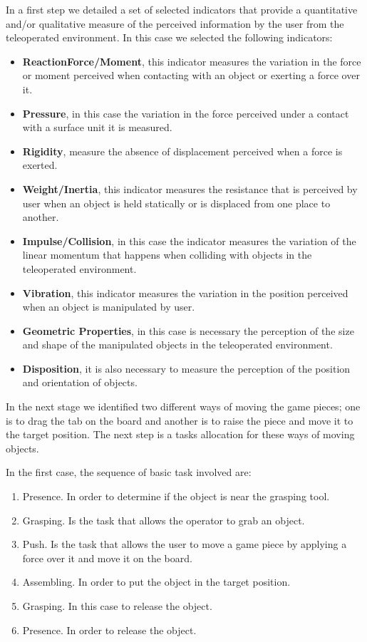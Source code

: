 \documentclass[journal,twoside]{JoPhA}
\begin{document}
In a first step we detailed a set of selected indicators that provide a quantitative and/or qualitative measure of the perceived information by the user from the teleoperated environment. In this case we selected the following indicators:
\begin{itemize}
\item \textbf{ReactionForce/Moment}, this indicator measures the variation in the force or moment perceived when contacting with an object or exerting a force over it.
\item \textbf{Pressure}, in this case the variation in the force perceived under a contact with a surface unit it is measured.
\item \textbf{Rigidity}, measure the absence of displacement perceived when a force is exerted. 
\item \textbf{Weight/Inertia}, this indicator measures the resistance that is perceived by user when an object is held statically or is displaced from one place to another.
\item \textbf{Impulse/Collision}, in this case the indicator measures the variation of the linear momentum that happens when colliding with objects in the teleoperated environment.
\item \textbf{Vibration}, this indicator measures the variation in the position perceived when an object is manipulated by user.
\item \textbf{Geometric Properties}, in this case is necessary the perception of the size and shape of the manipulated objects in the teleoperated environment.
\item \textbf{Disposition}, it is also necessary to measure the perception of the position and orientation of objects.
\end{itemize}

In the next stage we identified two different ways of moving the game pieces; one is to drag the tab on the board and another is to raise the piece and move it to the target position. The next step is a tasks allocation for these ways of moving objects. 

In the first case, the sequence of basic task involved are:
\begin{enumerate}
\item Presence. In order to determine if the object is near the grasping tool.
\item Grasping. Is the task that allows the operator to grab an object.
\item Push. Is the task that allows the user to move a game piece by applying a force over it and move it on the board. 
\item Assembling. In order to put the object in the target position.
\item Grasping. In this case to release the object.
\item Presence. In order to release the object.
\end{enumerate}
\end{document}
